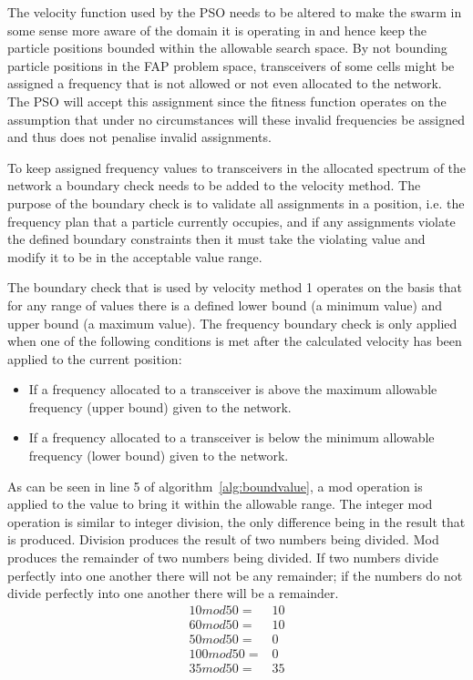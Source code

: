 The velocity function used by the \gls{PSO} needs to be altered to make the swarm in some sense more aware of the domain it is operating in and hence keep the particle positions bounded within the allowable search space. By not bounding particle positions in the \gls{FAP} problem space, transceivers of some cells might be assigned a frequency that is not allowed or not even allocated to the network. The \gls{PSO} will accept this assignment since the fitness function operates on the assumption that under no circumstances will these invalid frequencies be assigned and thus does not penalise invalid assignments.

To keep assigned frequency values to transceivers in the allocated spectrum of the network a boundary check needs to be added to the velocity method. The purpose of the boundary check is to validate all assignments in a position, i.e. the frequency plan that a particle currently occupies, and if any assignments violate the defined boundary constraints then it must take the violating value and modify it to be in the acceptable value range.

The boundary check that is used by velocity method 1 operates on the basis that for any range of values there is a defined lower bound (a minimum value) and upper bound (a maximum value). The frequency boundary check is only applied when one of the following conditions is met after the calculated velocity has been applied to the current position:
\begin{itemize}
\item If a frequency allocated to a transceiver is above the maximum allowable frequency (upper bound) given to the network. 
\item If a frequency allocated to a transceiver is below the minimum allowable frequency (lower bound) given to the network.
\end{itemize}

As can be seen in line 5 of algorithm~\ref{alg:boundvalue}, a mod operation is applied to the value to bring it within the allowable range. The integer mod operation is similar to integer division, the only difference being in the result that is produced. Division produces the result of two numbers being divided. Mod produces the remainder of two numbers being divided. If two numbers divide perfectly into one another there will not be any remainder; if the numbers do not divide perfectly into one another there will be a remainder. 
\begin{align}
	10 mod 50 =& 10 \\
	60 mod 50 =& 10 \\
	50 mod 50 =& 0 \\
	100 mod 50 =& 0 \\
	35 mod 50 =& 35 
\end{align}

